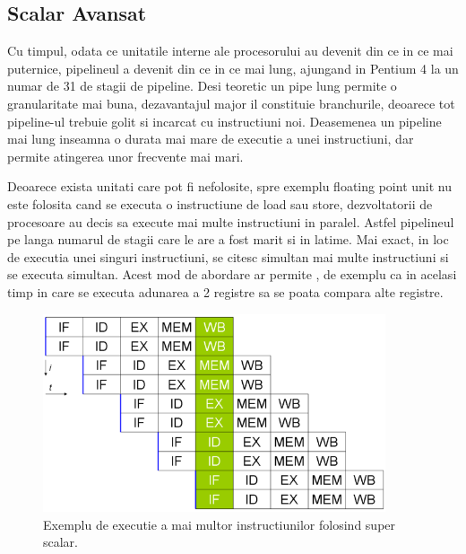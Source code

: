 \subsection{Scalar Avansat}

Cu timpul, odata ce unitatile interne ale procesorului au devenit din ce in ce mai puternice,
pipelineul a devenit din ce in ce mai lung, ajungand in Pentium 4 la un numar de 31 de stagii de
pipeline. Desi teoretic un pipe lung permite o granularitate mai buna, dezavantajul major il
constituie branchurile, deoarece tot pipeline-ul trebuie golit si incarcat cu instructiuni noi.
Deasemenea un pipeline mai lung inseamna o durata mai mare de executie a unei instructiuni, dar
permite atingerea unor frecvente mai mari. 

Deoarece exista unitati care pot fi nefolosite, spre exemplu floating point unit nu este
folosita cand se executa o instructiune de load sau store, dezvoltatorii de procesoare au decis sa
execute mai multe instructiuni in paralel. Astfel pipelineul pe langa numarul de stagii care le are
a fost marit si in latime. Mai exact, in loc de executia unei singuri instructiuni, se
citesc simultan mai multe instructiuni si se executa simultan. Acest mod de abordare ar permite ,
de exemplu ca in acelasi timp in care se executa adunarea a 2 registre sa se poata compara alte
registre\cite{jouppi1989available}.

\begin{figure}[ht] \centering
\includegraphics[width=0.9\textwidth]{img/superscalar.png}
\caption{Exemplu de executie a mai multor instructiunilor folosind super scalar.} \end{figure}


